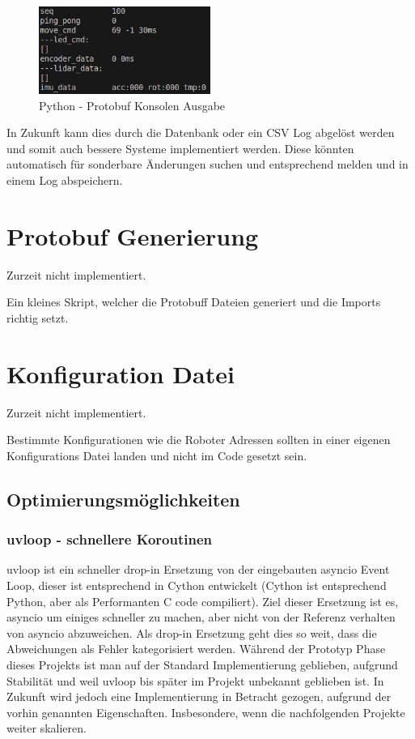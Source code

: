 \begin{figure}[H]
    \includegraphics[width=0.5\textwidth, center]{img/Backend/print_wrapper_all.png}
    \caption{Python - Protobuf Konsolen Ausgabe}
    \label{fig:py_konsole_o}
\end{figure}

In Zukunft kann dies durch die Datenbank oder ein CSV Log abgelöst werden 
und somit auch bessere Systeme implementiert werden.
% 
Diese könnten automatisch für sonderbare Änderungen suchen 
und entsprechend melden und in einem Log abspeichern.

\section{Protobuf Generierung}
Zurzeit nicht implementiert.

Ein kleines Skript, welcher die Protobuff Dateien generiert
und die Imports richtig setzt. 

\section{Konfiguration Datei}
Zurzeit nicht implementiert.

Bestimmte Konfigurationen wie die Roboter Adressen 
sollten in einer eigenen Konfigurations Datei landen und nicht im Code gesetzt sein.


\subsection{Optimierungsmöglichkeiten}
\label{subsec:Optimierungsmöglichkeiten}
\subsubsection{uvloop - schnellere Koroutinen}
uvloop ist ein schneller drop-in Ersetzung von der eingebauten asyncio Event Loop, 
dieser ist entsprechend in Cython entwickelt 
(Cython ist entsprechend Python, aber als Performanten C code compiliert).
Ziel dieser Ersetzung ist es, asyncio um einiges schneller zu machen, 
aber nicht von der Referenz verhalten von asyncio abzuweichen. 
Als drop-in Ersetzung geht dies so weit, 
dass die Abweichungen als Fehler kategorisiert werden.
% 
Während der Prototyp Phase dieses Projekts 
ist man auf der Standard Implementierung geblieben, aufgrund Stabilität
und weil uvloop bis später im Projekt unbekannt geblieben ist.
In Zukunft wird jedoch eine Implementierung in Betracht gezogen,
aufgrund der vorhin genannten Eigenschaften.
% 
Insbesondere, wenn die nachfolgenden Projekte weiter skalieren.

